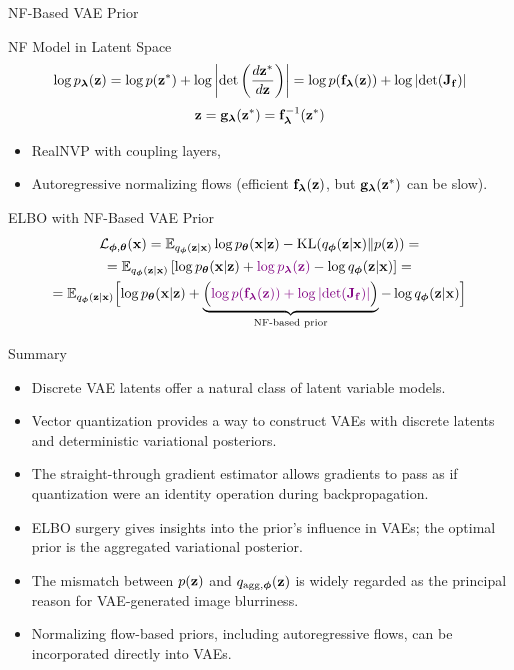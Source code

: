 \documentclass{beamer}
\renewcommand{\eqpause}{}
\renewcommand{\nextonslide}[1]{#1}
\begin{document}
\begin{frame}{NF-Based VAE Prior}
	\begin{block}{NF Model in Latent Space}
		\vspace{-0.5cm}
		\[
			\log p_{\boldsymbol{\lambda}}(\mathbf{z}) = \log p(\mathbf{z}^*) + \log  \left | \det \left(\frac{d \mathbf{z}^*}{d\mathbf{z}}\right)\right| = \log p(\mathbf{f}_{\boldsymbol{\lambda}}(\mathbf{z})) + \log \left | \det (\mathbf{J}_{\mathbf{f}})\right| 
		\]
		\vspace{-0.3cm}
		\[
			\mathbf{z} = \mathbf{g}_{\boldsymbol{\lambda}}(\mathbf{z}^*) = \mathbf{f}^{-1}_{\boldsymbol{\lambda}}(\mathbf{z}^*)
		\]
	\end{block}
    \eqpause
	\vspace{-0.3cm}
	\begin{itemize}
		\item RealNVP with coupling layers,
		\item Autoregressive normalizing flows (efficient $\mathbf{f}_{\boldsymbol{\lambda}}(\mathbf{z})$, but $\mathbf{g}_{\boldsymbol{\lambda}}(\mathbf{z}^*)$ can be slow).
	\end{itemize}
    \eqpause
	\begin{block}{ELBO with NF-Based VAE Prior}
		\vspace{-0.5cm}
		{\small
			\begin{multline*}
				\cL_{\bphi, \btheta}(\bx) = \bbE_{q_{\bphi}(\bz| \bx)} \log \pt(\bx| \bz) - \KL(q_{\bphi}(\bz| \bx) \| p(\bz))
				\nextonslide{= \\ = \bbE_{q_{\bphi}(\bz| \bx)} \left[ \log \pt(\bx | \bz) + {\color{violet}\log p_{\blambda}(\bz)} - \log q_{\bphi}(\bz| \bx) \right]}
				\nextonslide{= \\ = \bbE_{q_{\bphi}(\bz| \bx)} \Bigl[ \log \pt(\bx | \bz) + \underbrace{ \Bigl({\color{violet} \log p(\bff_{\blambda}(\bz)) + \log \left| \det (\bJ_\bff) \right|} \Bigr) }_{\text{NF-based prior}} - \log q_{\bphi}(\bz| \bx) \Bigr]} 
			\end{multline*}
		}
	\end{block}
\end{frame}
\begin{frame}{Summary}
	\begin{itemize}
		\item Discrete VAE latents offer a natural class of latent variable models.	
		\vfill
		\item Vector quantization provides a way to construct VAEs with discrete latents and deterministic variational posteriors.
		\vfill
		\item The straight-through gradient estimator allows gradients to pass as if quantization were an identity operation during backpropagation.			
		\vfill
		\item ELBO surgery gives insights into the prior's influence in VAEs; the optimal prior is the aggregated variational posterior. 
		\vfill
		\item The mismatch between $p(\mathbf{z})$ and $q_{\text{agg}, \boldsymbol{\phi}}(\mathbf{z})$ is widely regarded as the principal reason for VAE-generated image blurriness.
		\vfill
		\item Normalizing flow-based priors, including autoregressive flows, can be incorporated directly into VAEs.	
	\end{itemize}
\end{frame}
\end{document}
